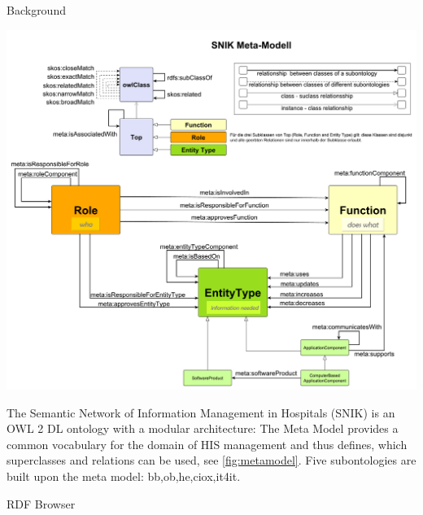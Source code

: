 \documentclass[portrait,final,a0paper,fontscale=0.310]{baposter}
\begin{document}
\begin{poster}
\begin{posterbox}[name=background,column=0,row=0]{Background}
\begin{minipage}{\linewidth}
\centering
{}
\label{fig:metamodel}
\includegraphics[width=\columnwidth]{img/metamodel.pdf}
\end{minipage}
The Semantic Network of Information Management in Hospitals (SNIK) is an OWL 2 DL ontology with a modular architecture:
The Meta Model provides a common vocabulary for the domain of HIS management and thus defines, which superclasses and relations can be used, see \cref{fig:metamodel}.
Five subontologies are built upon the meta model: bb,ob,he,ciox,it4it.
\vspace{0.3em}
\end{posterbox}
\begin{posterbox}[name=results,below=background]{RDF Browser}

\end{posterbox}
\end{poster}
\end{document}
